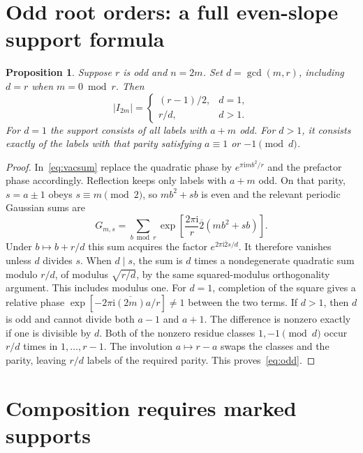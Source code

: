\documentclass[11pt]{article}
\newtheorem{proposition}[theorem]{Proposition}
\theoremstyle{remark}
\newcommand{\iu}{\mathrm{i}}
\begin{document}
\section{Odd root orders: a full even-slope support formula}\label{sec:arithmetic}

\begin{proposition}\label{prop:odd}
Suppose \(r\) is odd and \(n=2m\). Set \(d=\gcd(m,r)\), including \(d=r\) when \(m=0\bmod r\). Then
\begin{equation}\label{eq:odd}
 |I_{2m}|=
 \begin{cases}
 (r-1)/2,&d=1,\\
 r/d,& d>1 .
 \end{cases}
\end{equation}
For \(d=1\) the support consists of all labels with \(a+m\) odd. For \(d>1\), it consists exactly of the labels with that parity satisfying \(a\equiv1\) or \(-1\pmod d\).
\end{proposition}
\begin{proof}
In~\eqref{eq:vacsum} replace the quadratic phase by \(e^{\pi\iu m b^2/r}\) and the prefactor phase accordingly. Reflection keeps only labels with \(a+m\) odd. On that parity, \(s=a\pm1\) obeys \(s\equiv m\pmod2\), so \(m b^2+s b\) is even and the relevant periodic Gaussian sums are
\[
 G_{m,s}=\sum_{b\bmod r}
 \exp\!\left[\frac{2\pi\iu}{r}\overline 2(mb^2+sb)\right].
\]
Under \(b\mapsto b+r/d\) this sum acquires the factor \(e^{2\pi\iu\overline2s/d}\). It therefore vanishes unless \(d\) divides \(s\). When \(d\mid s\), the sum is \(d\) times a nondegenerate quadratic sum modulo \(r/d\), of modulus \(\sqrt{r/d}\), by the same squared-modulus orthogonality argument. This includes modulus one. For \(d=1\), completion of the square gives a relative phase \(\exp[-2\pi\iu\overline{(2m)}a/r]\ne1\) between the two terms. If \(d>1\), then \(d\) is odd and cannot divide both \(a-1\) and \(a+1\). The difference is nonzero exactly if one is divisible by \(d\). Both of the nonzero residue classes \(1,-1\pmod d\) occur \(r/d\) times in \(1,\ldots,r-1\). The involution \(a\mapsto r-a\) swaps the classes and the parity, leaving \(r/d\) labels of the required parity. This proves~\eqref{eq:odd}.
\end{proof}

\section{Composition requires marked supports}\label{sec:composition}
\end{document}
